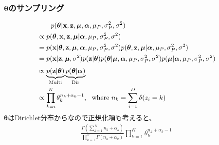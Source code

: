 \documentclass[a4paper,10.5pt,uplatex]{jsarticle}  %
\newcommand{\btheta}{\boldsymbol{\theta}}
\newcommand{\balpha}{\boldsymbol{\alpha}}
\newcommand{\bmu}{\boldsymbol{\mu}}
\newcommand{\bz}{\mathbf{z}}
\newcommand{\bx}{\mathbf{x}}
\begin{document}
\subsubsection{$\boldsymbol{\theta}$のサンプリング}
\begin{align}
  &\qquad p(\btheta | \bx, \bz, \bmu, \balpha, \mu_P, \sigma^2_P, \sigma^2)\\
  &\propto p(\btheta, \bx, \bz, \bmu | \balpha, \mu_P, \sigma^2_P, \sigma^2)\\
  &= p(\bx | \btheta, \bz, \bmu, \balpha, \mu_P, \sigma^2_P, \sigma^2) p(\btheta, \bz, \bmu | \balpha, \mu_P, \sigma^2_P, \sigma^2) \\
  &= p(\bx| \bz, \bmu, \sigma^2) p(\bz | \btheta) p(\btheta | \bmu, \balpha, \mu_P, \sigma^2_P, \sigma^2) p(\bmu | \balpha, \mu_P, \sigma^2_P, \sigma^2) \\[3pt]
  &\propto \underbrace{p(\bz | \btheta)}_{\rm Multi} \underbrace{p(\btheta | \balpha)}_{\rm Dir}\\
  &\propto \prod_{k=i}^{K} \theta_{k}^{n_k + \alpha_k -1}, \ \ {\rm where \ }  n_k = \sum_{i=1}^{D} \delta(z_i=k)
\end{align}
$\btheta$はDirichlet分布からなので正規化項も考えると、
\begin{align}
  \frac{\Gamma \left( \sum_{k=1}^K n_k + \alpha_k \right)}{\prod_{k=1}^K \Gamma(n_k + \alpha_k)} \prod_{k=1}^K \theta_{k}^{n_k + \alpha_k - 1}
\end{align}
\end{document}
